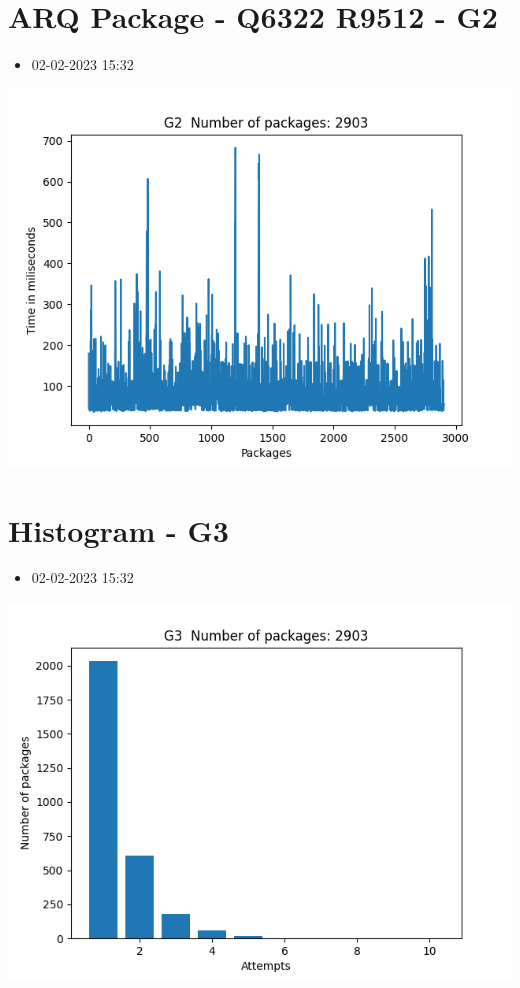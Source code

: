 \documentclass[10pt,a4paper]{article}
\begin{document}
\section*{\textlatin{ARQ Package - Q6322 R9512 - G2}}
\begin{itemize}
  \item 02-02-2023 15:32
\end{itemize}
\begin{center}
  \includegraphics[scale=0.8]{G2.png}
\end{center}

\section*{\textlatin{Histogram - G3}}
\begin{itemize}
  \item 02-02-2023 15:32
\end{itemize}
\begin{center}
  \includegraphics[scale=0.8]{G3.png}
\end{center}
\end{document}
